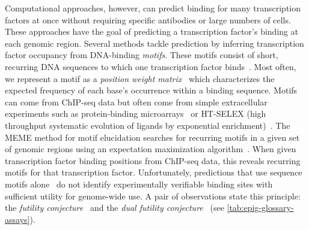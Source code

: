 \documentclass[5p]{elsarticle}
\newcommand{\rev}[1]{{\color{black}#1}}
\begin{document}
Computational approaches, however, can predict binding for many transcription factors at once without requiring specific antibodies or large numbers of cells.
These approaches have the goal of predicting a transcription factor's binding at each genomic region.
Several methods tackle prediction by inferring transcription factor occupancy from DNA-binding \emph{motifs}.
These motifs consist of short, recurring DNA sequences to which one transcription factor binds~\cite{Dhaeseleer2006WhatMotifs,Bailey1998CombiningSearches,Grant2011FIMO:Motif,Thomas-Chollier2008RSAT:Tools}.
Most often, we represent a motif as a \emph{position weight matrix}~\cite{Stormo1982UseColi,Wasserman2004AppliedElements} which characterizes the expected frequency of each base's occurrence within a binding sequence.
Motifs can come from ChIP-seq data but often come from simple extracellular experiments such as protein-binding microarrays~\cite{Badis2009DiversityFactors} or HT-SELEX (high throughput systematic evolution of ligands by exponential enrichment)~\cite{Ogawa2012High-ThroughputVitro}.
The MEME method for motif elucidation searches for recurring motifs in a given set of genomic regions using an expectation maximization algorithm~\cite{Bailey1995UnsupervisedMaximization}.
When \rev{gi\-ven} transcription factor binding positions from ChIP-seq data, this reveals recurring motifs for that transcription factor.
\rev{Unfortunately,} predictions that use sequence motifs alone~\cite{Jayaram2016EvaluatingPrediction} do not identify experimentally verifiable binding sites with sufficient utility for genome-wide use.
A pair of observations state this principle: the \emph{futility conjecture}~\cite{Wasserman2004AppliedElements} and the \emph{dual futility conjecture}~\cite{Karimzadeh2018VirtualTranscriptome} \rev{(see \autoref{tab:epig-glossary-assays})}.
\end{document}
